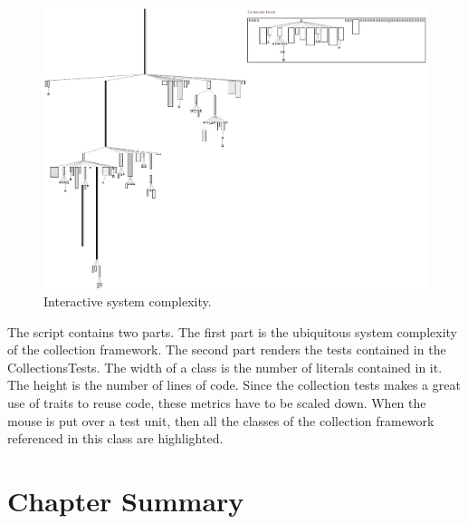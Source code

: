 \documentclass[a4paper,10pt,twoside]{book}
\begin{document}
\begin{figure}[htbp]
\centerline{\includegraphics[width=\linewidth]{testCoverage.png}}
\caption{Interactive system complexity.}
\label{fig:interactiveTestCoverage}
\end{figure}


The script contains two parts. The first part is the ubiquitous system complexity of the collection framework.  The second part renders the tests contained in the CollectionsTests. The width of a class is the number of literals contained in it. The height is the number of lines of code. Since the collection tests makes a great use of traits to reuse code, these metrics have to be scaled down. When the mouse is put over a test unit, then all the classes of the collection framework referenced in this class are highlighted. 

%


\section{Chapter Summary}
\end{document}
